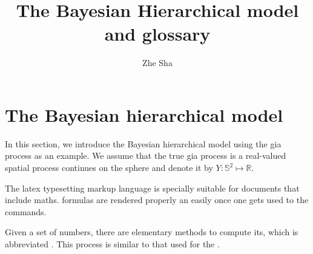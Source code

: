 \documentclass[a4paper,12pt]{article}
\begin{document}
 \title{The Bayesian Hierarchical model and glossary}
\author{Zhe Sha}
\maketitle

\onehalfspacing
{}
\section{The Bayesian hierarchical model}
In this section, we introduce the Bayesian hierarchical model using the \acrshort{gia} process as an example. We assume that the true \acrshort{gia} process is a real-valued spatial process continues on the sphere and denote it by $Y: \mathbb{S}^2 \mapsto \mathbb{R}$. 





The \Gls{latex} typesetting markup language is specially suitable 
for documents that include \gls{maths}. \Glspl{formula} are 
rendered properly an easily once one gets used to the commands.
 
Given a set of numbers, there are elementary methods to compute 
its, which is abbreviated . This 
process is similar to that used for the .
 
 
\clearpage
 
\printglossary[type=\acronymtype]
 
\printglossary
 
\end{document}
